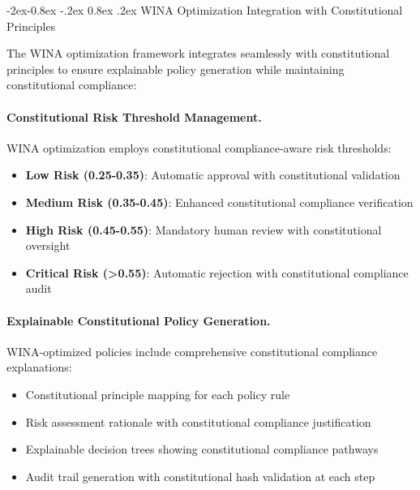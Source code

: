 \documentclass[manuscript,screen,9pt]{acmart}
\makeatletter
\renewcommand\subsubsection{\@startsection{subsubsection}{3}{\z@}%
  {-2ex\@plus -0.8ex \@minus -.2ex}%
  {0.8ex \@plus .2ex}%
  {\normalfont\normalsize\bfseries}}
\makeatother
\begin{document}
\subsubsection{WINA Optimization Integration with Constitutional Principles}
\label{subsubsec:wina_constitutional_integration}

The WINA optimization framework integrates seamlessly with constitutional principles to ensure explainable policy generation while maintaining constitutional compliance:

\paragraph{Constitutional Risk Threshold Management.} WINA optimization employs constitutional compliance-aware risk thresholds:
\begin{itemize}[itemsep=1pt,parsep=1pt]
    \item \textbf{Low Risk (0.25-0.35)}: Automatic approval with constitutional validation
    \item \textbf{Medium Risk (0.35-0.45)}: Enhanced constitutional compliance verification
    \item \textbf{High Risk (0.45-0.55)}: Mandatory human review with constitutional oversight
    \item \textbf{Critical Risk (>0.55)}: Automatic rejection with constitutional compliance audit
\end{itemize}

\paragraph{Explainable Constitutional Policy Generation.} WINA-optimized policies include comprehensive constitutional compliance explanations:
\begin{itemize}[itemsep=1pt,parsep=1pt]
    \item Constitutional principle mapping for each policy rule
    \item Risk assessment rationale with constitutional compliance justification
    \item Explainable decision trees showing constitutional compliance pathways
    \item Audit trail generation with constitutional hash validation at each step
\end{itemize}
\end{document}
